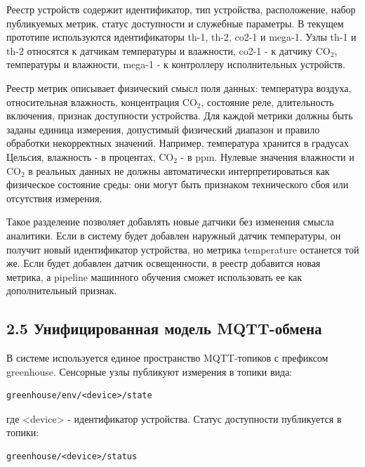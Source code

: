 \documentclass[a4paper,14pt]{extarticle}
\renewcommand{\texttt}[1]{\textnormal{#1}}
\begin{document}
Реестр устройств содержит идентификатор, тип устройства, расположение,
набор публикуемых метрик, статус доступности и служебные параметры. В
текущем прототипе используются идентификаторы \texttt{th-1},
\texttt{th-2}, \texttt{co2-1} и \texttt{mega-1}. Узлы \texttt{th-1} и
\texttt{th-2} относятся к датчикам температуры и влажности,
\texttt{co2-1} - к датчику CO\(_2\), температуры и влажности,
\texttt{mega-1} - к контроллеру исполнительных устройств.

Реестр метрик описывает физический смысл поля данных: температура
воздуха, относительная влажность, концентрация CO\(_2\), состояние реле,
длительность включения, признак доступности устройства. Для каждой
метрики должны быть заданы единица измерения, допустимый физический
диапазон и правило обработки некорректных значений. Например,
температура хранится в градусах Цельсия, влажность - в процентах,
CO\(_2\) - в ppm. Нулевые значения влажности и CO\(_2\) в реальных
данных не должны автоматически интерпретироваться как физическое
состояние среды: они могут быть признаком технического сбоя или
отсутствия измерения.

Такое разделение позволяет добавлять новые датчики без изменения смысла
аналитики. Если в систему будет добавлен наружный датчик температуры, он
получит новый идентификатор устройства, но метрика \texttt{temperature}
останется той же. Если будет добавлен датчик освещенности, в реестр
добавится новая метрика, а pipeline машинного обучения сможет
использовать ее как дополнительный признак.

\subsection{2.5 Унифицированная модель
MQTT-обмена}\label{ux443ux43dux438ux444ux438ux446ux438ux440ux43eux432ux430ux43dux43dux430ux44f-ux43cux43eux434ux435ux43bux44c-mqtt-ux43eux431ux43cux435ux43dux430}

В системе используется единое пространство MQTT-топиков с префиксом
\texttt{greenhouse}. Сенсорные узлы публикуют измерения в топики вида:

\begin{verbatim}
greenhouse/env/<device>/state
\end{verbatim}

где \texttt{\textless{}device\textgreater{}} - идентификатор устройства.
Статус доступности публикуется в топики:

\begin{verbatim}
greenhouse/<device>/status
\end{verbatim}
\end{document}
